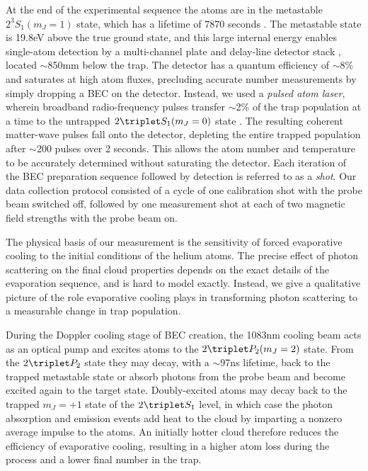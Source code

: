 At the end of the experimental sequence the atoms are in the metastable $2^3S_1(m_J=1)$ state, which has a lifetime of $7870$ seconds \cite{Hodgman09}.
	The metastable state is 19.8eV above the true ground state, and this large internal energy enables single-atom detection by a multi-channel plate and delay-line detector stack \cite{Manning10}, located $\sim$850mm below the trap.
	The detector has a quantum efficiency of $\sim 8\%$ and saturates at high atom fluxes, precluding accurate number measurements by simply dropping a BEC on the detector.
	Instead, we used a \emph{pulsed atom laser}, wherein broadband radio-frequency pulses transfer $\sim$2\% of the trap population {at a time} to the untrapped $2\triplet S_1(m_J=0)$ state \cite{Manning10,Henson18}.
	The resulting coherent matter-wave pulse{s} fall onto the detector, {depleting the entire trapped population after $\sim$200 pulses over 2 seconds.
	This allows}  the atom number and temperature to be accurately determined without saturating the detector.
	Each iteration of the BEC preparation sequence followed by detection is referred to as a \emph{shot}.
	Our data collection protocol consisted of a cycle of one calibration shot with the probe beam switched off, followed by one measurement shot at each of two magnetic field strengths with the probe beam on.
	

The physical basis of our measurement is the sensitivity of forced evaporative cooling to the initial conditions of the helium atoms.
	The precise effect of photon scattering on the final cloud properties depends on the exact details of the evaporation sequence, and is hard to model exactly.
	Instead, we give a qualitative picture of the role evaporative cooling plays in transforming photon scattering to a measurable change in trap population.
	

During the Doppler cooling stage of BEC creation, the 1083nm cooling beam acts as an optical pump and excites atoms to the $2\triplet P_2(m_J=2)$ state.
	From the $2\triplet P_2$ state they may decay, with a $\sim$97ns lifetime, back to the trapped metastable state or absorb photons from the probe beam and become excited again to the target state.
	Doubly-excited atoms may decay back to the trapped $m_J=+1$ state of the $2\triplet S_1$ level, in which case the photon absorption and emission events add heat to the cloud by imparting a nonzero average impulse to the atoms.
	An initially hotter cloud therefore reduces the efficiency of evaporative cooling, resulting in a higher atom loss during the process and a lower final number in the trap.
	

